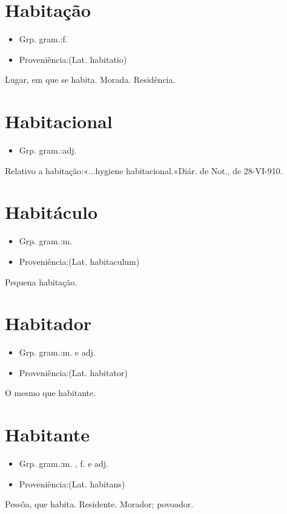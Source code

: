 \documentclass{article}
\begin{document}
\section{Habitação}
\begin{itemize}
\item {Grp. gram.:f.}
\end{itemize}
\begin{itemize}
\item {Proveniência:(Lat. \textunderscore habitatio\textunderscore )}
\end{itemize}
Lugar, em que se habita.
Morada.
Residência.
\section{Habitacional}
\begin{itemize}
\item {Grp. gram.:adj.}
\end{itemize}
Relativo a habitação:«\textunderscore ...hygiene habitacional.\textunderscore »\textunderscore Diár. de Not.\textunderscore , de 28-VI-910.
\section{Habitáculo}
\begin{itemize}
\item {Grp. gram.:m.}
\end{itemize}
\begin{itemize}
\item {Proveniência:(Lat. \textunderscore habitaculum\textunderscore )}
\end{itemize}
Pequena habitação.
\section{Habitador}
\begin{itemize}
\item {Grp. gram.:m.  e  adj.}
\end{itemize}
\begin{itemize}
\item {Proveniência:(Lat. \textunderscore habitator\textunderscore )}
\end{itemize}
O mesmo que \textunderscore habitante\textunderscore .
\section{Habitante}
\begin{itemize}
\item {Grp. gram.:m. ,  f.  e  adj.}
\end{itemize}
\begin{itemize}
\item {Proveniência:(Lat. \textunderscore habitans\textunderscore )}
\end{itemize}
Pessôa, que habita.
Residente.
Morador; povoador.
\end{document}
